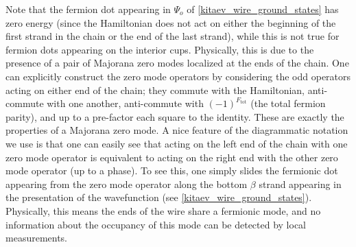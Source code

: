 Note that the fermion dot appearing in $\Psi_o$ of \eqref{kitaev_wire_ground_states} has zero energy (since the Hamiltonian does not act on either the beginning of the first strand in the chain or the end of the last strand), while this is not true for fermion dots 
appearing on the interior cups. 
Physically, this is due to the presence of a pair of Majorana zero modes localized at the ends of the chain. 
One can explicitly construct the zero mode operators by considering the odd operators acting on either end of the chain; 
they commute with the Hamiltonian, anti-commute with one another, anti-commute with $(-1)^{F_\text{tot}}$ (the total fermion parity), and up to a pre-factor each square to the identity.
These are exactly the properties of a Majorana zero mode. 
A nice feature of the diagrammatic notation we use is that one can easily see that acting on the left end of the chain with one zero mode operator is equivalent to acting on the right end with the other zero mode operator (up to a phase).
To see this, one simply slides the fermionic dot appearing from the zero mode operator along the bottom $\beta$ strand appearing in the presentation of the wavefunction (see \eqref{kitaev_wire_ground_states}).
Physically, this means the ends of the wire share a fermionic mode, 
and no information about the occupancy of this mode can be detected by local measurements.



